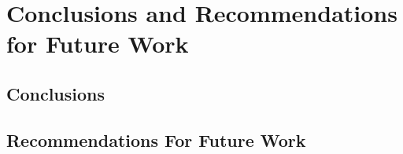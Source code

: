 \chapter{Conclusions and Recommendations for Future Work}
\section{Conclusions}
\section{Recommendations For Future Work}
\newpage